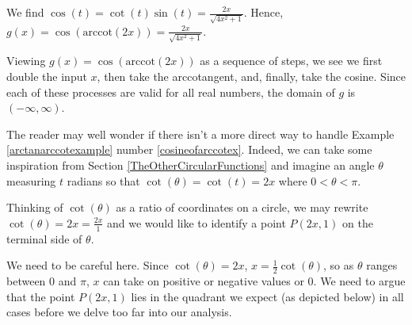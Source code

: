 \documentclass{ximera}
\begin{document}
\begin{example}
\begin{explanation}
\begin{enumerate}
\begin{enumerate}
 

We find  $ \cos(t) = \cot(t) \sin(t) = \frac{2x}{\sqrt{4x^2+1}}$.  Hence, $g(x) = \cos(\text{arccot}(2x)) = \frac{2x}{\sqrt{4x^2+1}}$.

 

Viewing $g(x) = \cos(\text{arccot}(2x))$ as a sequence of steps, we see we first double the input $x$, then take the arccotangent, and, finally, take the cosine.  Since each of these processes are valid for all real numbers, the domain of $g$ is $(-\infty, \infty)$.   

\end{enumerate}

\end{enumerate}
\end{explanation}
\end{example}

 


The reader may well wonder if there isn't a more direct way to handle Example  \ref{arctanarccotexample} number \ref{cosineofarccotex}. Indeed, we can take some inspiration from Section \ref{TheOtherCircularFunctions} and imagine an angle $\theta$ measuring $t$ radians so that $\cot(\theta) = \cot(t) = 2x$ where $0< \theta < \pi$.

 

Thinking of $\cot(\theta)$ as a ratio of coordinates on a circle, we may rewrite $\cot(\theta) = 2x = \frac{2x}{1}$ and we would like to identify a point $P(2x,1)$ on the terminal side of $\theta$.  

We need to be careful here.  Since $\cot(\theta) = 2x$, $x = \frac{1}{2} \cot(\theta)$, so as $\theta$ ranges between $0$ and $\pi$, $x$ can take on positive or negative values or $0$. We need to argue that the point $P(2x,1)$ lies in the quadrant we expect (as depicted below) in all cases before we delve too far into our analysis.
\end{document}
